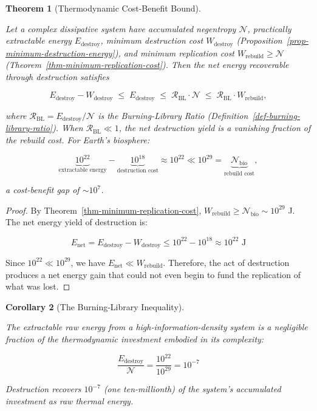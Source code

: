 \documentclass[11pt]{article}
\theoremstyle{plain}
\newtheorem{theorem}{Theorem}
\newtheorem{corollary}[theorem]{Corollary}
\theoremstyle{definition}
\theoremstyle{remark}
\begin{document}
\begin{theorem}[Thermodynamic Cost-Benefit Bound]
\label{thm-irrationality-destruction}

Let a complex dissipative system have accumulated negentropy $\mathcal{N}$, practically extractable energy $E_{\text{destroy}}$, minimum destruction cost $W_{\text{destroy}}$ (Proposition~\ref{prop-minimum-destruction-energy}), and minimum replication cost $W_{\text{rebuild}} \geq \mathcal{N}$ (Theorem~\ref{thm-minimum-replication-cost}). Then the net energy recoverable through destruction satisfies

$$E_{\text{destroy}} - W_{\text{destroy}} \;\leq\; E_{\text{destroy}} \;\leq\; \mathcal{R}_{\text{BL}} \cdot \mathcal{N} \;\leq\; \mathcal{R}_{\text{BL}} \cdot W_{\text{rebuild}},$$

where $\mathcal{R}_{\text{BL}} = E_{\text{destroy}} / \mathcal{N}$ is the Burning-Library Ratio (Definition~\ref{def-burning-library-ratio}). When $\mathcal{R}_{\text{BL}} \ll 1$, the net destruction yield is a vanishing fraction of the rebuild cost. For Earth's biosphere:

$$\underbrace{10^{22}}_{\text{extractable energy}} - \underbrace{10^{18}}_{\text{destruction cost}} \approx 10^{22} \ll 10^{29} = \underbrace{\mathcal{N}_{\text{bio}}}_{\text{rebuild cost}},$$

a cost-benefit gap of $\sim 10^7$.
\end{theorem}

\begin{proof}
By Theorem~\ref{thm-minimum-replication-cost}, $W_{\text{rebuild}} \geq \mathcal{N}_{\text{bio}} \sim 10^{29}$ J. The net energy yield of destruction is:

$$E_{\text{net}} = E_{\text{destroy}} - W_{\text{destroy}} \leq 10^{22} - 10^{18} \approx 10^{22} \text{ J}$$

Since $10^{22} \ll 10^{29}$, we have $E_{\text{net}} \ll W_{\text{rebuild}}$. Therefore, the act of destruction produces a net energy gain that could not even begin to fund the replication of what was lost.
\end{proof}

\begin{corollary}[The Burning-Library Inequality]
\label{cor-burning-library-inequality}

The extractable raw energy from a high-information-density system is a negligible fraction of the thermodynamic investment embodied in its complexity:

$$\frac{E_{\text{destroy}}}{\mathcal{N}} = \frac{10^{22}}{10^{29}} = 10^{-7}$$

Destruction recovers $10^{-7}$ (one ten-millionth) of the system's accumulated investment as raw thermal energy.
\end{corollary}
\end{document}

